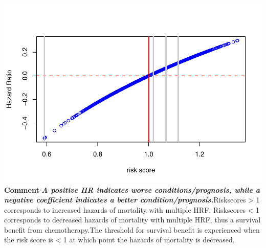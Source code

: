 \documentclass[
  11pt,
]{article}
\begin{document}
\includegraphics{Hazard_and_Risk_plot_updated_files/figure-latex/unnamed-chunk-8-1.pdf}
\textbf{Comment} \newline \textbf{\emph{A positive HR indicates worse
conditions/prognosis, while a negative coefficient indicates a better
condition/prognosis.}}\newline Riskscores \textgreater{} 1 corresponds
to increased hazards of mortality with multiple HRF. Riskscores
\textless{} 1 corresponds to decreased hazards of mortality with
multiple HRF, thus a survival benefit from chemotherapy.\newline  The
threshold for survival benefit is experienced when the risk score is
\textless{} 1 at which point the hazards of mortality is decreased.

\newpage
\end{document}
